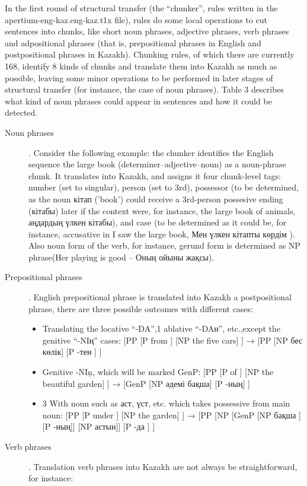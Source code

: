 \documentclass[11pt]{article}
\begin{document}
In the first round of structural transfer (the ``chunker'', rules written in the apertium-eng-kaz.eng-kaz.t1x file), rules do some local operations to cut sentences into chunks, like short noun phrases, adjective phrases, verb phrases and adpositional phrases (that is, prepositional phrases in English and postpositional phrases in Kazakh).
Chunking rules, of which there are currently 168, identify 8 kinds of chunks and translate them into Kazakh as much as possible, leaving some minor operations to be performed in later stages of structural transfer (for instance, the case of noun phrases). Table 3 describes what kind of noun phrases could appear in sentences and how it could be detected.


\begin{description}
\item[Noun phrases]. Consider the following example: the chunker identifies the English sequence the large book  (determiner–adjective–noun) as a noun-phrase chunk. It translates into Kazakh, and assigns it four chunk-level tags: number (set to singular), person (set to 3rd), possessor (to be determined, as the noun кітап ('book') could receive a 3rd-person possesive ending (кітабы) later if the context were, for instance, the large book of animals, аңдардың үлкен кітабы), and case (to be determined as it could be, for instance, accusative in I saw the large book, Мен үлкен кітапты көрдім ). Also noun form of the verb, for instance,  gerund form is determined as NP phrase(Her playing is good – Оның ойыны жақсы).
\item[Prepositional phrases]. English prepositional phrase is translated into Kazakh a postpositional phrase, there are three possible outcomes with different cases:
\begin{itemize}
\item Translating the locative ``-{D}{A}'',1 ablative ``-{D}{A}н'', etc.,except the genitive ``-{N}{I}ң'' cases: [PP [P from ] [NP the five cars] ] → [PP [NP бес көлік] [P -тен ] ]
\item Genitive -NIņ, which will be marked GenP:  [PP [P of ] [NP the beautiful garden] ] → [GenP [NP әдемі бақша] [P -ның] ] 
\item 3 With noun such as аст, үст, etc. which takes possessive from main noun:  [PP [P under ] [NP the garden] ] → [PP [NP [GenP [NP бақша ][P -ның]] [NP астын]] [P -да ] ]
\end{itemize}
\item[Verb phrases]. Translation verb phrases into Kazakh  are not always be straightforward, for instance: 

\end{description}
\end{document}
